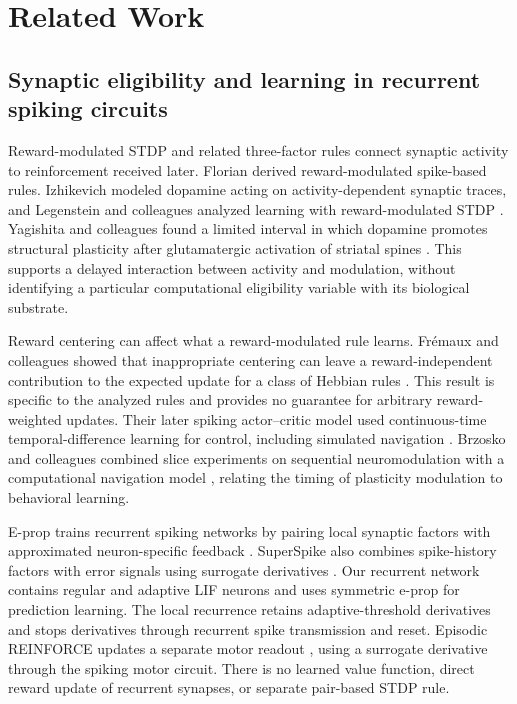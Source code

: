 \section{Related Work}
\subsection{Synaptic eligibility and learning in recurrent spiking circuits}
Reward-modulated STDP and related three-factor rules connect synaptic activity to reinforcement received later. Florian derived reward-modulated spike-based rules. Izhikevich modeled dopamine acting on activity-dependent synaptic traces, and Legenstein and colleagues analyzed learning with reward-modulated STDP \cite{florian2007reinforcement,izhikevich2007distal,legenstein2008learning}. Yagishita and colleagues found a limited interval in which dopamine promotes structural plasticity after glutamatergic activation of striatal spines \cite{yagishita2014critical}. This supports a delayed interaction between activity and modulation, without identifying a particular computational eligibility variable with its biological substrate.

Reward centering can affect what a reward-modulated rule learns. Fr\'emaux and colleagues showed that inappropriate centering can leave a reward-independent contribution to the expected update for a class of Hebbian rules \cite{fremaux2010functional}. This result is specific to the analyzed rules and provides no guarantee for arbitrary reward-weighted updates. Their later spiking actor--critic model used continuous-time temporal-difference learning for control, including simulated navigation \cite{fremaux2013continuous}. Brzosko and colleagues combined slice experiments on sequential neuromodulation with a computational navigation model \cite{brzosko2017sequential}, relating the timing of plasticity modulation to behavioral learning.

E-prop trains recurrent spiking networks by pairing local synaptic factors with approximated neuron-specific feedback \cite{bellec2020}. SuperSpike also combines spike-history factors with error signals using surrogate derivatives \cite{zenke2018superspike}. Our recurrent network contains regular and adaptive LIF neurons and uses symmetric e-prop for prediction learning. The local recurrence retains adaptive-threshold derivatives and stops derivatives through recurrent spike transmission and reset. Episodic REINFORCE updates a separate motor readout \cite{williams1992}, using a surrogate derivative through the spiking motor circuit. There is no learned value function, direct reward update of recurrent synapses, or separate pair-based STDP rule.

